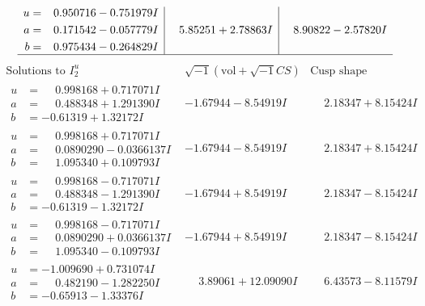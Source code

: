 \documentclass[1p]{elsarticle_modified}
\theoremstyle{definition}
\newcommand{\I}{\sqrt{-1}}
\begin{document}
$$\begin{array}{c|c|c}
\begin{aligned}
u &= \phantom{-}0.950716 - 0.751979 I \\
a &= \phantom{-}0.171542 - 0.057779 I \\
b &= \phantom{-}0.975434 - 0.264829 I\end{aligned}
 & \phantom{-}5.85251 + 2.78863 I & \phantom{-}8.90822 - 2.57820 I\\
 \hline 
 \end{array}$$\newpage$$\begin{array}{c|c|c}  
\text{Solutions to }I^u_{2}& \I (\text{vol} + \sqrt{-1}CS) & \text{Cusp shape}\\
 \hline 
\begin{aligned}
u &= \phantom{-}0.998168 + 0.717071 I \\
a &= \phantom{-}0.488348 + 1.291390 I \\
b &= -0.61319 + 1.32172 I\end{aligned}
 & -1.67944 - 8.54919 I & \phantom{-}2.18347 + 8.15424 I \\ \hline\begin{aligned}
u &= \phantom{-}0.998168 + 0.717071 I \\
a &= \phantom{-}0.0890290 - 0.0366137 I \\
b &= \phantom{-}1.095340 + 0.109793 I\end{aligned}
 & -1.67944 - 8.54919 I & \phantom{-}2.18347 + 8.15424 I \\ \hline\begin{aligned}
u &= \phantom{-}0.998168 - 0.717071 I \\
a &= \phantom{-}0.488348 - 1.291390 I \\
b &= -0.61319 - 1.32172 I\end{aligned}
 & -1.67944 + 8.54919 I & \phantom{-}2.18347 - 8.15424 I \\ \hline\begin{aligned}
u &= \phantom{-}0.998168 - 0.717071 I \\
a &= \phantom{-}0.0890290 + 0.0366137 I \\
b &= \phantom{-}1.095340 - 0.109793 I\end{aligned}
 & -1.67944 + 8.54919 I & \phantom{-}2.18347 - 8.15424 I \\ \hline\begin{aligned}
u &= -1.009690 + 0.731074 I \\
a &= \phantom{-}0.482190 - 1.282250 I \\
b &= -0.65913 - 1.33376 I\end{aligned}
 & \phantom{-}3.89061 + 12.09090 I & \phantom{-}6.43573 - 8.11579 I \\ \hline\begin{aligned}

\end{aligned}
\end{array}$$
\end{document}
